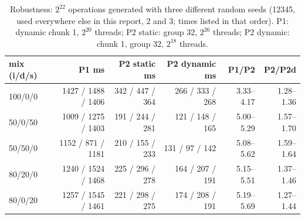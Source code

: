 \begin{table}[H]\centering\small
\caption{Robustness: $2^{22}$ operations generated with three different random seeds (12345, used everywhere else in this report, 2 and 3; times listed in that order). P1: dynamic chunk 1, $2^{20}$ threads; P2 static: group 32, $2^{26}$ threads; P2 dynamic: chunk 1, group 32, $2^{18}$ threads.}\label{tab:q1seeds}
\begin{tabular}{lrrrrr}
\toprule
mix (i/d/s) & P1 ms & P2 static ms & P2 dynamic ms & P1/P2 & P2/P2d \\
\midrule
100/0/0 & 1427 / 1488 / 1406 & 342 / 447 / 364 & 266 / 333 / 268 & 3.33--4.17 & 1.28--1.36 \\
50/0/50 & 1009 / 1275 / 1403 & 191 / 244 / 281 & 121 / 148 / 165 & 5.00--5.29 & 1.57--1.70 \\
50/50/0 & 1152 / 871 / 1181 & 210 / 155 / 233 & 131 / 97 / 142 & 5.08--5.62 & 1.59--1.64 \\
80/20/0 & 1240 / 1524 / 1468 & 225 / 296 / 278 & 164 / 207 / 191 & 5.15--5.51 & 1.37--1.46 \\
80/0/20 & 1257 / 1545 / 1461 & 221 / 298 / 275 & 174 / 208 / 191 & 5.19--5.69 & 1.27--1.44 \\
\bottomrule
\end{tabular}
\end{table}
